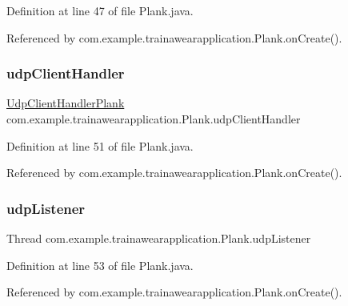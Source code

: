 Definition at line 47 of file Plank.\+java.



Referenced by com.\+example.\+trainawearapplication.\+Plank.\+on\+Create().

\mbox{\label{classcom_1_1example_1_1trainawearapplication_1_1_plank_a993af1f74afdb25d3d31aeef952d173d}} 
\subsubsection{\texorpdfstring{udpClientHandler}{udpClientHandler}}
{\footnotesize\ttfamily \mbox{\hyperlink{classcom_1_1example_1_1trainawearapplication_1_1_udp_client_handler_plank}{Udp\+Client\+Handler\+Plank}} com.\+example.\+trainawearapplication.\+Plank.\+udp\+Client\+Handler\hspace{0.3cm}{\ttfamily [package]}}



Definition at line 51 of file Plank.\+java.



Referenced by com.\+example.\+trainawearapplication.\+Plank.\+on\+Create().

\mbox{\label{classcom_1_1example_1_1trainawearapplication_1_1_plank_ac43cc854533c5fc22b5638149d26512c}} 
\subsubsection{\texorpdfstring{udpListener}{udpListener}}
{\footnotesize\ttfamily Thread com.\+example.\+trainawearapplication.\+Plank.\+udp\+Listener\hspace{0.3cm}{\ttfamily [private]}}



Definition at line 53 of file Plank.\+java.



Referenced by com.\+example.\+trainawearapplication.\+Plank.\+on\+Create().

